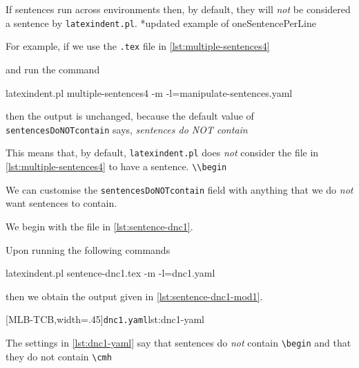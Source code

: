 \documentclass[10pt]{article}
\begin{document}
 If sentences run across environments then, by default, they will \emph{not} be
 considered a sentence by \texttt{latexindent.pl}. *{updated example
 of oneSentencePerLine}
 \begin{example}
 For example, if we use the \texttt{.tex} file in \cref{lst:multiple-sentences4}


 and run the command  

 \begin{commandshell}
latexindent.pl multiple-sentences4 -m -l=manipulate-sentences.yaml
\end{commandshell}

 then the output is unchanged, because the default value of
 \texttt{sentencesDoNOTcontain} says, \emph{sentences do NOT contain}

 This means that, by default, \texttt{latexindent.pl} does \emph{not} consider the file
 in \cref{lst:multiple-sentences4} to have a sentence. \lstinline!\\begin!
 \end{example}

 \begin{example}
 We can customise the \texttt{sentencesDoNOTcontain} field with anything that we do
 \emph{not} want sentences to contain.

 We begin with the file in \cref{lst:sentence-dnc1}.


 Upon running the following commands

 \begin{commandshell}
latexindent.pl sentence-dnc1.tex -m -l=dnc1.yaml
\end{commandshell}

 then we obtain the output given in \cref{lst:sentence-dnc1-mod1}.

 \begin{cmhtcbraster}[ raster left skip=-2.5cm,
   raster right skip=-1cm,
   raster force size=false,
   raster column 1/.style={add to width=3cm},
  ]
  [MLB-TCB,width=.45\textwidth]{\texttt{dnc1.yaml}}{lst:dnc1-yaml}
 \end{cmhtcbraster}

 The settings in \cref{lst:dnc1-yaml} say that sentences do \emph{not} contain
 \lstinline!\begin! and that they do not contain \lstinline!\cmh!
 \end{example}
\end{document}
